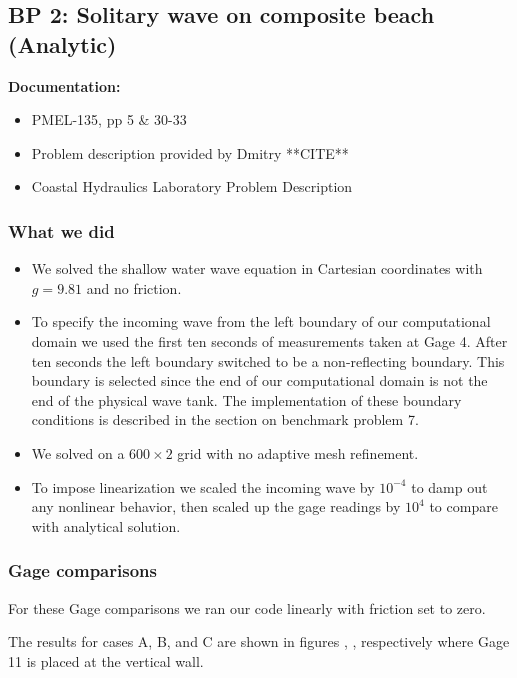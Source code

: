 \newsection

\subsection{BP 2:
 Solitary wave on composite beach (Analytic)}

{\bf Documentation:}

\begin{itemize}
\item PMEL-135, pp 5 \& 30-33 \cite{SynolakisBernard:pmel135}
\item Problem description provided by Dmitry **CITE**
\item Coastal Hydraulics Laboratory Problem Description \cite{CHLBP2}
\end{itemize}

\subsubsection{What we did}
\begin{itemize}
\item We solved the shallow water wave equation in Cartesian coordinates with $g = 9.81$ and no friction.
\item To specify the incoming wave from the left boundary of our computational domain we used the first ten seconds of  measurements taken at Gage 4.  After ten seconds the left boundary switched to be a non-reflecting boundary.  This boundary is selected since the end of our computational domain is not the end of the physical wave tank.  The implementation of these boundary conditions is described in the section on benchmark problem 7. 
\item We solved on a $600 \times 2$ grid with no adaptive mesh refinement.
\item To impose linearization we scaled the incoming wave by $10^{-4}$ to damp out any nonlinear behavior, then scaled up the gage readings by $10^4$ to compare with analytical solution.
\end{itemize}

\subsubsection{Gage comparisons}
For these Gage comparisons we ran our code linearly with friction set to zero. 

The results for cases A, B, and C are shown in figures , ,  respectively where Gage 11 is placed at the vertical wall.

